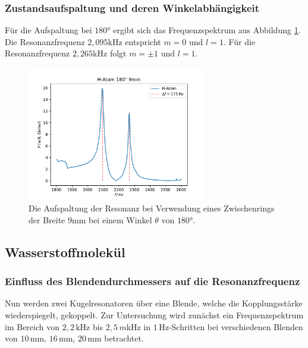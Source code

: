 \subsubsection*{Zustandsaufspaltung und deren Winkelabhängigkeit}


Für die Aufspaltung bei $180°$ ergibt sich das Frequenzspektrum aus Abbildung \ref{fig:9mm_res}.
Die Resonanzfrequenz $2,095$kHz entspricht $m=0$ und $l=1$. Für die Resonanzfrequenz $2,265$kHz folgt $m=\pm 1$ und $l=1$.
\begin{figure}[H]
    \center
    \includegraphics[width=0.7\textwidth]{plots/Hatom/zustandsaufspaltung_9.pdf}
    \caption{Die Aufspaltung der Resonanz bei Verwendung eines Zwischenrings der Breite $9$mm bei einem Winkel $\theta$ von $180°$.}
    \label{fig:9mm_res}
\end{figure}
\newpage
\subsection{Wasserstoffmolekül}
\subsubsection*{Einfluss des Blendendurchmessers auf die Resonanzfrequenz}
Nun werden zwei Kugelresonatoren über eine Blende, welche die Kopplungsstärke wiederspiegelt, gekoppelt.
Zur Untersuchung wird zunächst ein Frequenzspektrum im Bereich von $2,2\,$kHz bis $2,5\,m$kHz in $1\,$Hz-Schritten bei verschiedenen
Blenden von $10\,$mm, $16\,$mm, $20\,$mm betrachtet.\\

